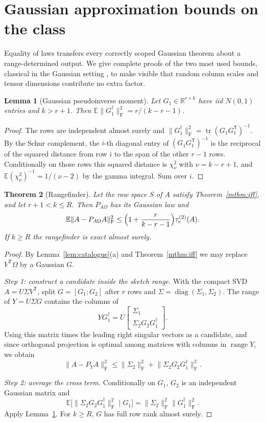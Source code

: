 \documentclass[11pt,a4paper]{article}
\newtheorem{theorem}{Theorem}[section]
\newtheorem{lemma}[theorem]{Lemma}
\theoremstyle{definition}
\theoremstyle{remark}
\numberwithin{equation}{section}
\newcommand{\E}{\mathbb E}
\newcommand{\R}{\mathbb R}
\newcommand{\T}{{\mathsf T}}
\newcommand{\tr}{\operatorname{tr}}
\newcommand{\range}{\operatorname{range}}
\newcommand{\diag}{\operatorname{diag}}
\newcommand{\norm}[1]{\lVert#1\rVert}
\newcommand{\F}{\mathrm F}
\begin{document}
\section{Gaussian approximation bounds on the class}\label{sec:bounds}

Equality of laws transfers every correctly scoped Gaussian theorem about a
range-determined output. We give complete proofs of the two most used
bounds, classical in the Gaussian setting \cite{HMT,TYUCpsd}, to make visible
that random column scales and tensor dimensions contribute no extra factor.

\begin{lemma}[Gaussian pseudoinverse moment]\label{lem:inverse}
Let $G_1\in\R^{r\times k}$ have iid $N(0,1)$ entries and $k>r+1$. Then
$\E\norm{G_1^\dagger}_\F^2=r/(k-r-1)$.
\end{lemma}

\begin{proof}
The rows are independent almost surely and
$\norm{G_1^\dagger}_\F^2=\tr(G_1G_1^\T)^{-1}$. By the Schur complement, the
$i$-th diagonal entry of $(G_1G_1^\T)^{-1}$ is the reciprocal of the squared
distance from row $i$ to the span of the other $r-1$ rows. Conditionally on
those rows this squared distance is $\chi^2_\nu$ with $\nu=k-r+1$, and
$\E(\chi^2_\nu)^{-1}=1/(\nu-2)$ by the gamma integral. Sum over $i$.
\end{proof}

\begin{theorem}[Rangefinder]\label{thm:rf}
Let the row space $S$ of $A$ satisfy Theorem~\ref{mthm:iff}, and let $r+1<k\le R$.
Then $P_{A\Omega}$ has its Gaussian law and
\begin{equation}\label{eq:rf}
 \E\norm{A-P_{A\Omega}A}_\F^2\le\Bigl(1+\frac r{k-r-1}\Bigr)\tau^{(2)}_r(A).
\end{equation}
If $k\ge R$ the rangefinder is exact almost surely.
\end{theorem}

\begin{proof}
By Lemma~\ref{lem:catalogue}(a) and Theorem~\ref{mthm:iff} we may replace
$V^\T\Omega$ by a Gaussian $G$.

\emph{Step 1: construct a candidate inside the sketch range.}
With the compact SVD $A=U\Sigma V^\T$, split
$G=[G_1;G_2]$ after $r$ rows and $\Sigma=\diag(\Sigma_1,\Sigma_2)$. The range of
$Y=U\Sigma G$ contains the columns of
\[
 YG_1^\dagger
 =U\begin{bmatrix}\Sigma_1\\\Sigma_2G_2G_1^\dagger\end{bmatrix}.
\]
Using this matrix times the leading right singular vectors as a candidate,
and since orthogonal projection is optimal among matrices with columns in
$\range Y$, we obtain
\[
 \norm{A-P_YA}_\F^2
 \le\norm{\Sigma_2}_\F^2+\norm{\Sigma_2G_2G_1^\dagger}_\F^2.
\]

\emph{Step 2: average the cross term.}
Conditionally on $G_1$, $G_2$ is an independent Gaussian matrix and
\[
 \E\bigl[\norm{\Sigma_2G_2G_1^\dagger}_\F^2\mid G_1\bigr]
 =\norm{\Sigma_2}_\F^2\norm{G_1^\dagger}_\F^2.
\]
Apply Lemma~\ref{lem:inverse}. For $k\ge R$, $G$ has full row rank almost
surely.
\end{proof}
\end{document}
